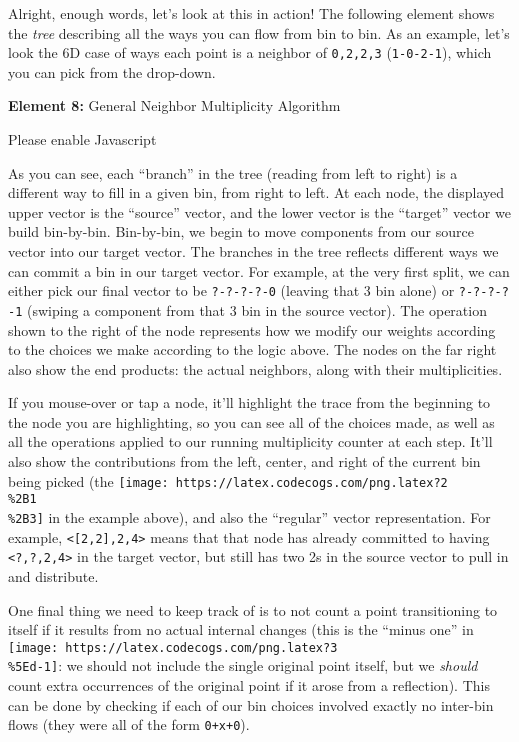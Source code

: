 \documentclass[]{article}
\begin{document}
Alright, enough words, let's look at this in action! The following element shows
the \emph{tree} describing all the ways you can flow from bin to bin. As an
example, let's look the 6D case of ways each point is a neighbor of
\texttt{0,2,2,3} (\texttt{1-0-2-1}), which you can pick from the drop-down.

\leavevmode\hypertarget{golTree}{}%
\textbf{Element 8:} General Neighbor Multiplicity Algorithm

\leavevmode\hypertarget{golTreeCont}{}%
Please enable Javascript

As you can see, each ``branch'' in the tree (reading from left to right) is a
different way to fill in a given bin, from right to left. At each node, the
displayed upper vector is the ``source'' vector, and the lower vector is the
``target'' vector we build bin-by-bin. Bin-by-bin, we begin to move components
from our source vector into our target vector. The branches in the tree reflects
different ways we can commit a bin in our target vector. For example, at the
very first split, we can either pick our final vector to be \texttt{?-?-?-?-0}
(leaving that 3 bin alone) or \texttt{?-?-?-?-1} (swiping a component from that
3 bin in the source vector). The operation shown to the right of the node
represents how we modify our weights according to the choices we make according
to the logic above. The nodes on the far right also show the end products: the
actual neighbors, along with their multiplicities.

If you mouse-over or tap a node, it'll highlight the trace from the beginning to
the node you are highlighting, so you can see all of the choices made, as well
as all the operations applied to our running multiplicity counter at each step.
It'll also show the contributions from the left, center, and right of the
current bin being picked (the
\texttt{[image: https://latex.codecogs.com/png.latex?2\\\%2B1\\\%2B3]} in the
example above), and also the ``regular'' vector representation. For example,
\texttt{\textless{}{[}2,2{]},2,4\textgreater{}} means that that node has already
committed to having \texttt{\textless{}?,?,2,4\textgreater{}} in the target
vector, but still has two 2s in the source vector to pull in and distribute.

One final thing we need to keep track of is to not count a point transitioning
to itself if it results from no actual internal changes (this is the ``minus
one'' in \texttt{[image: https://latex.codecogs.com/png.latex?3\\\%5Ed-1]}: we
should not include the single original point itself, but we \emph{should} count
extra occurrences of the original point if it arose from a reflection). This can
be done by checking if each of our bin choices involved exactly no inter-bin
flows (they were all of the form \texttt{0+x+0}).
\end{document}
